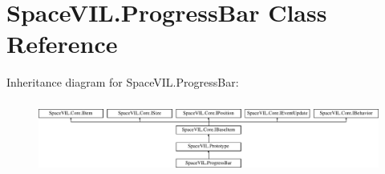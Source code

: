 \hypertarget{class_space_v_i_l_1_1_progress_bar}{}\section{Space\+V\+I\+L.\+Progress\+Bar Class Reference}
\label{class_space_v_i_l_1_1_progress_bar}
Inheritance diagram for Space\+V\+I\+L.\+Progress\+Bar\+:\begin{figure}[H]
\begin{center}
\leavevmode
\includegraphics[height=2.421622cm]{class_space_v_i_l_1_1_progress_bar}
\end{center}
\end{figure}
